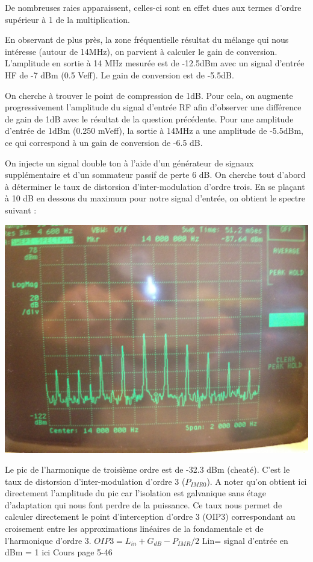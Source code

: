 \documentclass{article}
\begin{document}
De nombreuses raies apparaissent, celles-ci sont en effet dues aux termes d'ordre supérieur à 1 de la multiplication.


En observant de plus près, la zone fréquentielle résultat du mélange qui nous intéresse (autour de 14MHz), on parvient à calculer le gain de conversion.
L'amplitude en sortie à 14 MHz mesurée est de -12.5dBm avec un signal d'entrée HF de -7 dBm (0.5 Veff).
Le gain de conversion est de -5.5dB.


On cherche à trouver le point de compression de 1dB. Pour cela, on augmente progressivement l'amplitude du signal d'entrée RF afin d'observer une différence de gain de 1dB avec le résultat de la question précédente.
Pour une amplitude d'entrée de 1dBm (0.250 mVeff), la sortie à 14MHz a une amplitude de -5.5dBm, ce qui correspond à un gain de  conversion de -6.5 dB.


On injecte un signal double ton à l'aide d'un générateur de signaux supplémentaire et d'un sommateur passif de perte 6 dB.
On cherche tout d'abord à déterminer le taux de distorsion d'inter-modulation d'ordre trois.
En se plaçant à 10 dB en dessous du maximum pour notre signal d'entrée, on obtient le spectre suivant :
\begin{center}
\includegraphics[width=0.7\linewidth]{9_3_4.jpg}
\end{center}

Le pic de l'harmonique de troisième ordre est de -32.3 dBm (cheaté). C'est le taux de distorsion d'inter-modulation d'ordre 3 ($P_{IMR0}$). A noter qu'on obtient ici directement l'amplitude du pic car l'isolation est galvanique sans étage d'adaptation qui nous font perdre de la puissance.
Ce taux nous permet de calculer directement le point d'interception d'ordre 3 (OIP3) correspondant au croisement entre les approximations linéaires de la fondamentale et de l'harmonique d'ordre 3.
$OIP3=L_{in}+G_{dB}-P_{IMR}/2$
Lin= signal d'entrée en dBm = 1 ici
Cours page 5-46
 
\end{document}
